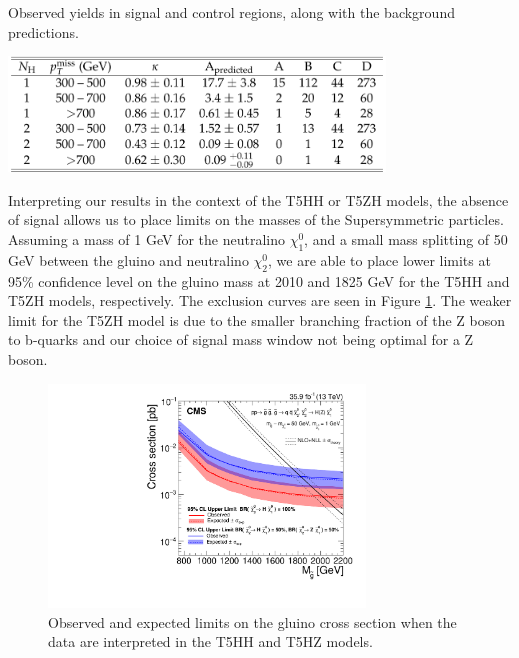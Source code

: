 \begin{table}[htbp]
\centering
\caption{Observed yields in signal and control regions, along with the background predictions.}
\includegraphics[width=0.75\textwidth]{figs/CMS-SUS-17-006_Table-aux_001.pdf}
\label{tab:yieldstable}
\end{table}

Interpreting our results in the context of the T5HH or T5ZH models, the absence of signal allows us to place limits on the masses of the Supersymmetric particles. Assuming a mass of 1 GeV for the neutralino $\chi_{1}^{0}$, and a small mass splitting of 50 GeV between the gluino and neutralino $\chi_{2}^{0}$, we are able to place lower limits at 95\% confidence level on the gluino mass at 2010 and 1825 GeV for the T5HH and T5ZH models, respectively. The exclusion curves are seen in Figure \ref{fig:brazil}. The weaker limit for the T5ZH model is due to the smaller branching fraction of the Z boson to b-quarks and our choice of signal mass window not being optimal for a Z boson.

\begin{figure}[htbp]
\centering
\includegraphics[width=0.75\textwidth]{figs/CMS-SUS-17-006_Figure_003.pdf}
\caption{Observed and expected limits on the gluino cross section when the data are interpreted in the T5HH and T5HZ models.}
\label{fig:brazil}
\end{figure}
